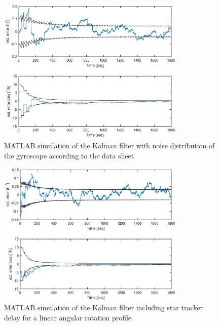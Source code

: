 \begin{figure}[htb]
    \centering
    \includegraphics[width = 0.8\textwidth]{4-experiment-design/img/software/kf_30_0_lin.eps}
    \caption{MATLAB simulation of the Kalman filter with noise distribution of the gyroscope according to the data sheet}
    \label{fig::software::Kalman_filter}
\end{figure}
\begin{figure}[htb]
    \centering
    \includegraphics[width = 0.8\textwidth]{4-experiment-design/img/software/kf_10_8_lin.eps}
    \caption{MATLAB simulation of the Kalman filter including star tracker delay for a linear angular rotation profile}
    \label{fig::software::Kalman_filter_delay_1}
\end{figure}
